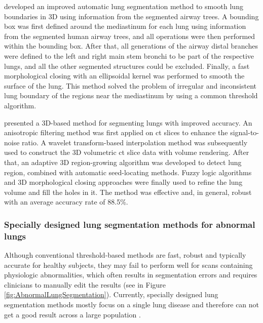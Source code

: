 \cite{ukil2005smoothing} developed an improved automatic lung segmentation method to smooth lung boundaries in 3D using information from the segmented airway trees. A bounding box was first defined around the mediastinum for each lung using information from the segmented human airway trees, and all operations were then performed within the bounding box. After that, all generations of the airway distal branches were defined to the left and right main stem bronchi to be part of the respective lungs, and all the other segmented structures could be excluded. Finally, a fast morphological closing with an ellipsoidal kernel was performed to smooth the surface of the lung. This method solved the problem of irregular and inconsistent lung boundary of the regions near the mediastinum by using a common threshold algorithm. 

\cite{sun20063d} presented a 3D-based method for segmenting lungs with improved accuracy. An anisotropic filtering method was first applied on \gls{ct} slices to enhance the signal-to-noise ratio. A wavelet transform-based interpolation method was subsequently used to construct the 3D volumetric \gls{ct} slice data with volume rendering. After that, an adaptive 3D region-growing algorithm was developed to detect lung region, combined with automatic seed-locating methods. Fuzzy logic algorithms and 3D morphological closing approaches were finally used to refine the lung volume and fill the holes in it. The method was effective and, in general, robust with an average accuracy rate of 88.5\%.  

\subsubsection{Specially designed lung segmentation methods for abnormal lungs}
Although conventional threshold-based methods are fast, robust and typically accurate for healthy subjects, they may fail to perform well for scans containing physiologic abnormalities, which often results in segmentation errors and requires clinicians to manually edit the results (see in Figure \ref{fig:AbnormalLungSegmentation}). Currently, specially designed lung segmentation methods mostly focus on a single lung disease and therefore can not get a good result across a large population \citep{kitasaka2003lung,sluimer2005toward,pu2008adaptive,pu2011shape,prasad2008automatic,korfiatis2008texture,wang2009automated,van2009automatic,sun2012automated}. 

